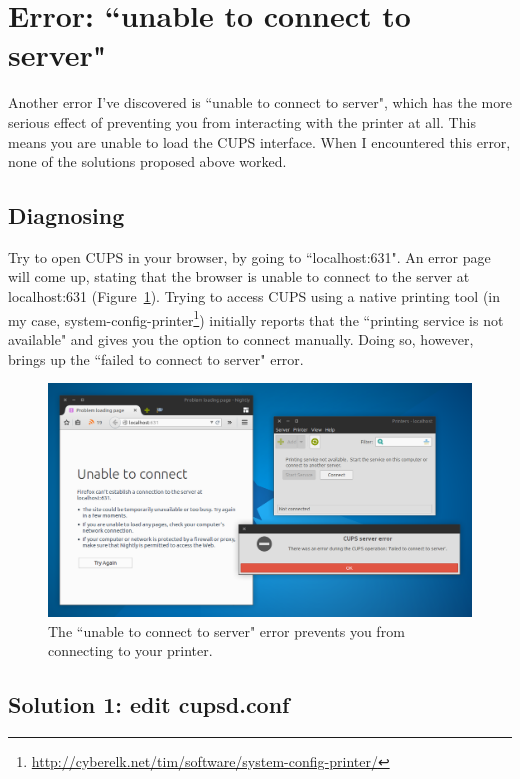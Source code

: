 \documentclass[12pt, a4paper]{article}
\begin{document}
\section*{Error: ``unable to connect to server"}

Another error I've discovered is ``unable to connect to server", which has the more serious effect of preventing you from interacting with the printer at all. This means you are unable to load the CUPS interface. When I encountered this error, none of the solutions proposed above worked.

\subsection*{Diagnosing}

Try to open CUPS in your browser, by going to ``localhost:631". An error page will come up, stating that the browser is unable to connect to the server at localhost:631 (Figure~\ref{fig11}). Trying to access CUPS using a native printing tool (in my case, system-config-printer\footnote{\url{http://cyberelk.net/tim/software/system-config-printer/}}) initially reports that the ``printing service is not available" and gives you the option to connect manually. Doing so, however, brings up the ``failed to connect to server" error.

\begin{figure}[!htp]
  \centering
  \includegraphics[width=1\textwidth]{imgs/unable-to-connect-to-server-1.png}
  \caption{The ``unable to connect to server" error prevents you from connecting to your printer.}
  \label{fig11}
\end{figure}

\subsection*{Solution 1: edit cupsd.conf}
\end{document}
